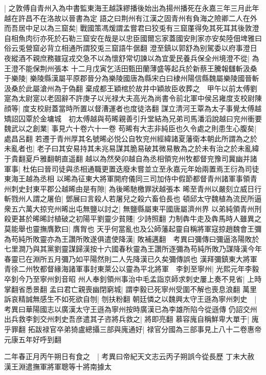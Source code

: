 |{
	之敦傅自青州入為中書監東海王越誅繆播後始出為揚州播死在永嘉三年三月此年越在許昌不在洛故以晉書為定}
語之曰荆州有江漢之固青州有負海之險卿二人在外而吾居中足以為三窟矣|{
	戰國策馮煖謂孟嘗君曰狡兎有三窟厪得免其死耳其後敦澄自相魚肉衍亦死於石勒三窟安在哉是以忠臣國爾忘家蓋國安則家亦安矣陸佃埤雅曰俗云兎營窟必背立相通所謂狡兎三窟語牛倨翻}
澄至鎮以郭舒為别駕委以府事澄日夜縱酒不親庶務雖寇戎交急不以為懷舒常切諫以為宜愛民養兵保全州境澄不從|{
	為王澄不能保荆州張本}
十二月戊寅乞活田甄田蘭薄盛等起兵於新蔡王騰報讎斬汲桑于樂陵|{
	樂陵縣漢屬平原郡晉分為樂陵國唐為縣宋白曰棣州陽信縣魏屬樂陵國晉斬汲桑於此屬滄州為于偽翻}
棄成都王穎棺於故井中穎故臣收葬之　甲午以前太傅劉寔為太尉寔以老固辭不許庚子以光禄大夫高光為尚書令前北軍中侯呂雍度支校尉陳顔等|{
	度支校尉蓋當時所置以督漕運者也度徒洛翻}
謀立清河王覃為太子事覺太傅越矯詔囚覃於金墉城　初太傅越與苟晞親善引升堂結為兄弟司馬潘滔說越曰兖州衝要魏武以之創業|{
	事見六十卷六十一卷}
苟晞有大志非純臣也久令處之則患生心腹矣|{
	處昌呂翻}
若遷于青州厚其名號晞必悦公自牧兖州經緯諸夏藩衛本朝此所謂為之於未亂者也|{
	老子曰其安易持其未兆易謀其脆易破其微易散為之於未有治之於未亂緯于貴翻夏戶雅翻朝直遥翻}
越以為然癸卯越自為丞相領兖州牧都督兖豫司冀幽并諸軍事|{
	杜佑曰晉司徒與丞相通職更置迭廢未嘗並立至永嘉元年始兩置焉王衍為司徒東海王越為丞相}
以晞為征東大將軍開府儀同三司加侍中假節都督青州諸軍事領青州刺史封東平郡公越晞由是有隙|{
	為後晞馳檄罪狀越張本}
晞至青州以嚴刻立威日行斬戮州人謂之屠伯|{
	鄧展曰言殺人若屠兒之殺六畜伯長也}
頓邱太守魏植為流民所逼衆五六萬大掠兖州晞出屯無鹽以討之|{
	無鹽縣屬東平國唐屬濟州界}
以弟純領青州刑殺更甚於晞晞討植破之初陽平劉靈少貧賤|{
	少詩照翻}
力制犇牛走及犇馬時人雖異之莫能舉也靈撫膺歎曰|{
	膺胷也}
天乎何當亂也及公師藩起靈自稱將軍寇掠趙魏會王彌為苟純所敗靈亦為王讚所敗遂俱遣使降漢|{
	敗補邁翻　考異曰彌傳曰彌逼洛陽敗於七里澗乃與其黨劉靈謀歸漢按十六國春秋靈為王讚所逐彌為苟純所敗乃謀降漢今年春靈已在淵所五月彌乃如平陽然則二人先降漢已久矣彌傳誤也}
漢拜彌鎮東大將軍青徐二州牧都督緣海諸軍事封東萊公以靈為平北將軍　李釗至寧州|{
	光熙元年李毅卒釗今乃至寧州釗音昭}
州人奉釗領州事治中毛孟詣京師求刺史屢上奏不見省|{
	上時掌翻省悉景翻}
孟曰君亡親喪幽閉窮城|{
	謂李毅已死寧州受圍不解也喪息浪翻}
萬里訴哀精誠無感生不如死欲自刎|{
	刎扶粉翻}
朝廷憐之以魏興太守王遜為寧州刺史　|{
	考異曰華陽國志以廣漢太守王遜為寧州按時廣漢已為李雄所陷今從遜傳}
仍詔交州出兵救李釗交州刺史吾彦遣其子咨將兵救之|{
	將即亮翻}
慕容廆自稱鮮卑大單于|{
	廆乎罪翻}
拓跋禄官卒弟猗盧總攝三部與廆通好|{
	禄官分國為三部事見上八十二卷惠帝元康五年好呼到翻}


二年春正月丙午朔日有食之　|{
	考異曰帝紀天文志云丙子朔誤今從長歷}
丁未大赦　漢王淵遣撫軍將軍聰等十將南據太

